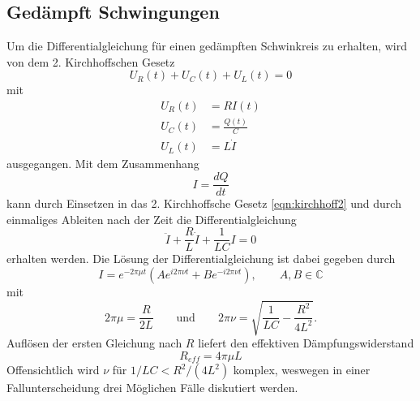\subsection{Gedämpft Schwingungen}
\label{sec:gedämpft}
Um die Differentialgleichung für einen gedämpften Schwinkreis zu erhalten, wird von dem 2. Kirchhoffschen Gesetz
\begin{equation}
    U_R(t)+U_C(t)+U_L(t)=0
    \label{eqn:kirchhoff2}
\end{equation}
mit
\begin{align*}
U_R(t)&=RI(t)                           \\
U_C(t)&=\frac{Q(t)}{C}                  \\
U_L(t)&=L\dot{I}
\end{align*}
ausgegangen. Mit dem Zusammenhang
\begin{equation*}
    I=\frac{dQ}{dt}
\end{equation*}
kann durch Einsetzen in das 2. Kirchhoffsche Gesetz \eqref{eqn:kirchhoff2} und durch einmaliges Ableiten nach der Zeit
die Differentialgleichung
\begin{equation}
    \ddot{I}+\frac{R}{L}\dot{I}+\frac{1}{LC}I=0
    \label{eqn:DGL1}
\end{equation}
erhalten werden. Die Lösung der Differentialgleichung ist dabei gegeben durch
\begin{equation}
    I=e^{-2\pi\mu t}\left(Ae^{i2\pi\nu t}+Be^{-i2\pi\nu t}\right), \qquad A,B\in\mathbb{C}
    \label{eqn:Losung1}
\end{equation}
mit
\begin{equation*}
    2\pi \mu=\frac{R}{2L}
    \qquad\text{und}\qquad
    2\pi \nu=\sqrt{\frac{1}{LC}-\frac{R^2}{4L^2}} .
\end{equation*}
Auflösen der ersten Gleichung nach $R$ liefert den effektiven Dämpfungswiderstand
\begin{equation}
    R_{eff}=4\pi\mu L
    \label{eqn:Reff}
\end{equation}
Offensichtlich wird $\nu$ für $1/LC<R^2/(4L^2)$ komplex, weswegen in einer Fallunterscheidung drei Möglichen Fälle
diskutiert werden.

